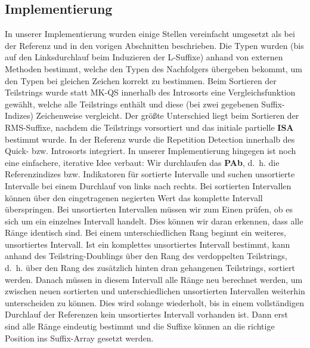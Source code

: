 \subsection{Implementierung}

In unserer Implementierung wurden einige Stellen vereinfacht umgesetzt als bei der Referenz und in den vorigen Abschnitten beschrieben. Die Typen wurden (bis auf den Linksdurchlauf beim Induzieren der L-Suffixe) anhand von externen Methoden bestimmt, welche den Typen des Nachfolgers übergeben bekommt, um den Typen bei gleichen Zeichen korrekt zu bestimmen. Beim Sortieren der Teilstrings wurde statt MK-QS innerhalb des Introsorts eine Vergleichsfunktion gewählt, welche alle Teilstrings enthält und diese (bei zwei gegebenen Suffix-Indizes) Zeichenweise vergleicht. 
Der größte Unterschied liegt beim Sortieren der RMS-Suffixe, nachdem die Teilstrings vorsortiert und das initiale partielle \textbf{ISA} bestimmt wurde. In der Referenz wurde die Repetition Detection innerhalb des Quick- bzw. Introsorts integriert. In unserer Implementierung hingegen ist noch eine einfachere, iterative Idee verbaut: Wir durchlaufen das \textbf{PAb}, d.~h. die Referenzindizes bzw. Indikatoren für sortierte Intervalle und suchen unsortierte Intervalle bei einem Durchlauf von links nach rechts. Bei sortierten Intervallen können über den eingetragenen negierten Wert das komplette Intervall überspringen. Bei unsortierten Intervallen müssen wir zum Einen prüfen, ob es sich um ein einzelnes Intervall handelt. Dies können wir daran erkennen, dass alle Ränge identisch sind. Bei einem unterschiedlichen Rang beginnt ein weiteres, unsortiertes Intervall. Ist ein komplettes unsortiertes Intervall bestimmt, kann anhand des Teilstring-Doublings über den Rang des verdoppelten Teilstrings, d.~h. über den Rang des zusätzlich hinten dran gehangenen Teilstrings, sortiert werden. Danach müssen in diesem Intervall alle Ränge neu berechnet werden, um zwischen neuen sortierten und unterschiedlichen unsortierten Intervallen weiterhin unterscheiden zu können. Dies wird solange wiederholt, bis in einem vollständigen Durchlauf der Referenzen kein unsortiertes Intervall vorhanden ist. Dann erst sind alle Ränge eindeutig bestimmt und die Suffixe können an die richtige Position ins Suffix-Array gesetzt werden.